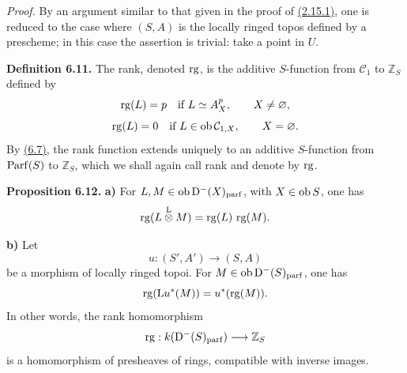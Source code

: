 \emph{Proof.} By an argument similar to that given in the proof of \hyperlink{sga6.e01.lem.2-15-1}{(2.15.1)}, one is reduced to the case where \((S,A)\) is the locally ringed topos defined by a prescheme; in this case the assertion is trivial: take a point in \(U\).

\textbf{Definition 6.11.} The rank, denoted \(\rg\), is the additive \(S\)-function from \(\mathcal C_1\) to \(\mathbb Z_S\) defined by
\[
  \rg(L)=p\quad\text{if } L\simeq A_X^p,
  \qquad X\ne\varnothing,
\]
\[
  \rg(L)=0\quad\text{if } L\in\Ob\mathcal C_{1,X},
  \qquad X=\varnothing.
\]
By \hyperlink{sga6.e01.prop.6-7}{(6.7)}, the rank function extends uniquely to an additive \(S\)-function from \(\Parf(S)\) to \(\mathbb Z_S\), which we shall again call rank and denote by \(\rg\).

\textbf{Proposition 6.12.} \textbf{a)} For \(L,M\in\Ob\Dpx^-(X)_{\mathrm{parf}}\), with \(X\in\Ob S\), one has
\[
  \rg(L\overset{\mathrm L}{\otimes} M)=\rg(L)\,\rg(M).
\]

\textbf{b)} Let
\[
  u:(S',A')\longrightarrow(S,A)
\]
be a morphism of locally ringed topoi. For \(M\in\Ob\Dpx^-(S)_{\mathrm{parf}}\), one has
\[
  \rg(\mathrm L u^*(M))=u^*(\rg(M)).
\]
In other words, the rank homomorphism
\[
  \rg:k(\Dpx^-(S)_{\mathrm{parf}})\longrightarrow \mathbb Z_S
\]
is a homomorphism of presheaves of rings, compatible with inverse images.



\providecommand{\Cpx}{\mathrm C}
\providecommand{\Kpx}{\mathrm K}
\providecommand{\Dpx}{\mathrm D}
\providecommand{\Ho}{\mathrm H}
\providecommand{\RHom}{\mathrm R\!\operatorname{Hom}}
\providecommand{\Ob}{\operatorname{ob}}
\providecommand{\Hom}{\operatorname{Hom}}
\providecommand{\RHom}{\mathrm R\!\operatorname{Hom}}
\providecommand{\Ext}{\operatorname{Ext}}
\providecommand{\Tor}{\operatorname{Tor}}
\providecommand{\Tr}{\operatorname{Tr}}
\providecommand{\Add}{\operatorname{Add}}
\providecommand{\Cart}{\operatorname{Cart}}
\providecommand{\Parf}{\operatorname{Parf}}
\providecommand{\coh}{\operatorname{coh}}
\providecommand{\amp}{\operatorname{amp}}
\providecommand{\cl}{\operatorname{cl}}
\providecommand{\rg}{\operatorname{rg}}
\providecommand{\Id}{\operatorname{Id}}
\providecommand{\Ker}{\operatorname{Ker}}
\providecommand{\Im}{\operatorname{Im}}
\providecommand{\cH}{\mathcal H}
\providecommand{\Zs}{\mathbb Z_S}
\providecommand{\A}{\mathcal A}
\providecommand{\cC}{\mathcal C}
\providecommand{\cCzero}{\mathcal C_0}
\providecommand{\otL}{\mathop{\otimes}^{\mathrm L}}
\providecommand{\tamp}{\operatorname{tor.amp}}
\providecommand{\pamp}{\operatorname{parf.amp}}
\providecommand{\pdim}{\operatorname{parf.dim}}
\providecommand{\bon}{\mathrm b}
\providecommand{\parf}{\operatorname{parf}}
\providecommand{\parff}{\operatorname{parf}}
\providecommand{\ac}{\mathrm{ac}}


